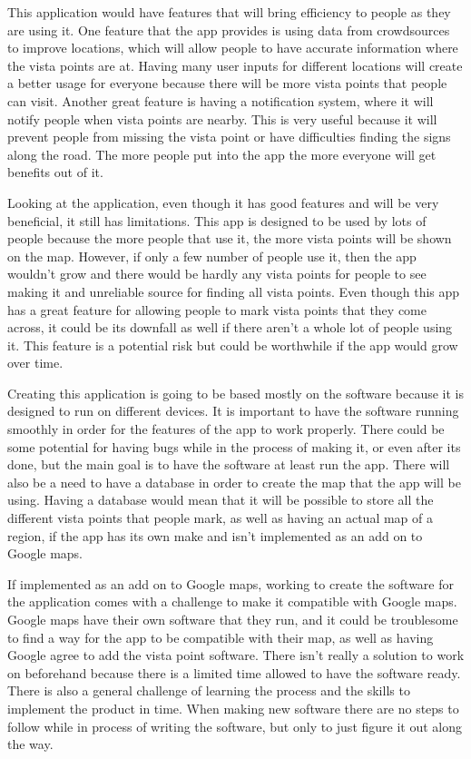 \documentclass[12pt]{article}
\begin{document}
This application would have features that will bring efficiency to people as they are using it. One feature that the app provides is using data from crowdsources to improve locations, which will allow people to have accurate information where the vista points are at. Having many user inputs for different locations will create a better usage for everyone because there will be more vista points that people can visit. Another great feature is having a notification system, where it will notify people when vista points are nearby. This is very useful because it will prevent people from missing the vista point or have difficulties finding the signs along the road. The more people put into the app the more everyone will get benefits out of it.

Looking at the application, even though it has good features and will be very beneficial, it still has limitations. This app is designed to be used by lots of people because the more people that use it, the more vista points will be shown on the map. However, if only a few number of people use it, then the app wouldn’t grow and there would be hardly any vista points for people to see making it and unreliable source for finding all vista points. Even though this app has a great feature for allowing people to mark vista points that they come across, it could be its downfall as well if there aren’t a whole lot of people using it. This feature is a potential risk but could be worthwhile if the app would grow over time.

Creating this application is going to be based mostly on the software because it is designed to run on different devices. It is important to have the software running smoothly in order for the features of the app to work properly. There could be some potential for having bugs while in the process of making it, or even after its done, but the main goal is to have the software at least run the app. There will also be a need to have a database in order to create the map that the app will be using. Having a database would mean that it will be possible to store all the different vista points that people mark, as well as having an actual map of a region, if the app has its own make and isn’t implemented as an add on to Google maps.

If implemented as an add on to Google maps, working to create the software for the application comes with a challenge to make it compatible with Google maps. Google maps have their own software that they run, and it could be troublesome to find a way for the app to be compatible with their map, as well as having Google agree to add the vista point software. There isn’t really a solution to work on beforehand because there is a limited time allowed to have the software ready. There is also a general challenge of learning the process and the skills to implement the product in time. When making new software there are no steps to follow while in process of writing the software, but only to just figure it out along the way.
\end{document}
